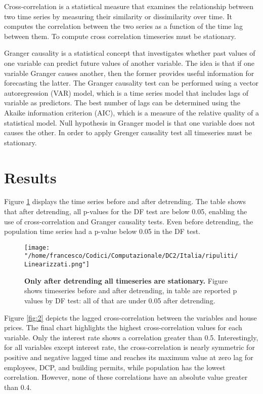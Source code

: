 \documentclass[a4paper,11pt,rmp,superscriptaddress]{report}
\begin{document}
Cross-correlation is a statistical measure that examines the relationship between two time series by measuring their similarity or 
dissimilarity over time. 
It computes the correlation between the two series as a function of the time lag between them. To compute cross correlation timeseries
must be stationary.

Granger causality is a statistical concept that investigates whether past values of one variable can predict future values of another 
variable. The idea is that if one variable Granger causes another, then the former provides useful information for forecasting the latter.
The Granger causality test can be performed using a vector autoregression (VAR) model, 
which is a time series model that includes lags of variable as predictors. The best number of lags can be 
determined using the Akaike information criterion (AIC), which is a measure of the relative quality of a statistical model.
Null hypothesis in Granger model is that one variable does not causes the other.
In order to apply Grenger causality test all timeseries must be stationary.

\section*{Results}
Figure \ref*{fig:1} displays the time series before and after detrending. The table shows that after detrending, 
all p-values for the DF test are below 0.05, enabling the use of cross-correlation and Granger causality tests. 
Even before detrending, the population time series had a p-value below 0.05 in the DF test.

\begin{figure}[h!]
    \texttt{[image: "/home/francesco/Codici/Computazionale/DC2/Italia/ripuliti/Linearizzati.png"]}
    \caption[short]{\textbf{Only after detrending all timeseries are stationary.} Figure shows timeseries before and after detrending, 
    in table are reported p values by DF test: all of that are under 0.05 after detrending.}
    \label{fig:1}
\end{figure}

Figure \ref*{fig:2} depicts the lagged cross-correlation between the variables and house prices. The final chart highlights the
highest cross-correlation values for each variable. Only the interest rate shows a correlation greater than 0.5. Interestingly,
for all variables except interest rate, the cross-correlation is nearly symmetric for positive and negative lagged time and
reaches its maximum value at zero lag for employees, DCP, and building permits, while population has the lowest correlation.
However, none of these correlations have an absolute value greater than 0.4.
\end{document}
